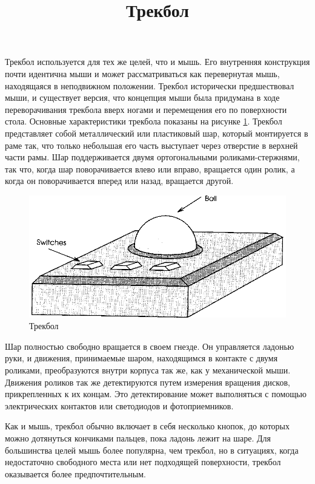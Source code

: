 \documentclass[11pt, a4paper]{article}
\begin{document}
\title{Трекбол}

\maketitle

    Трекбол используется для тех же целей, что и мышь. Его внутренняя конструкция почти идентична мыши и может рассматриваться как перевернутая мышь, находящаяся в неподвижном положении. Трекбол исторически предшествовал мыши, и существует версия, что концепция мыши была придумана в ходе переворачивания трекбола вверх ногами и перемещения его по поверхности стола. Основные характеристики трекбола показаны на рисунке \ref{fig:theoryTrackballGeneric}. Трекбол представляет собой металлический или пластиковый шар, который монтируется в раме так, что только небольшая его часть выступает через отверстие в верхней части рамы. Шар поддерживается двумя ортогональными роликами-стержнями, так что, когда шар поворачивается влево или вправо, вращается один ролик, а когда он поворачивается вперед или назад, вращается другой.
    
    \begin{figure}[h]
        \centering
    \includegraphics[width=0.5\linewidth]{theory_track/2.3.png}
        \caption{Трекбол}
        \label{fig:theoryTrackballGeneric}
    \end{figure}
    
    Шар полностью свободно вращается в своем гнезде. Он управляется ладонью руки, и движения, принимаемые шаром, находящимся в контакте с двумя роликами, преобразуются внутри корпуса так же, как у механической мыши. Движения роликов так же детектируются путем измерения вращения дисков, прикрепленных к их концам. Это детектирование может выполняться с помощью электрических контактов или светодиодов и фотоприемников.
    
    Как и мышь, трекбол обычно включает в себя несколько кнопок, до которых можно дотянуться кончиками пальцев, пока ладонь лежит на шаре. Для большинства целей мышь более популярна, чем трекбол, но в ситуациях, когда недостаточно свободного места или нет подходящей поверхности, трекбол оказывается более предпочтительным.
\end{document}
